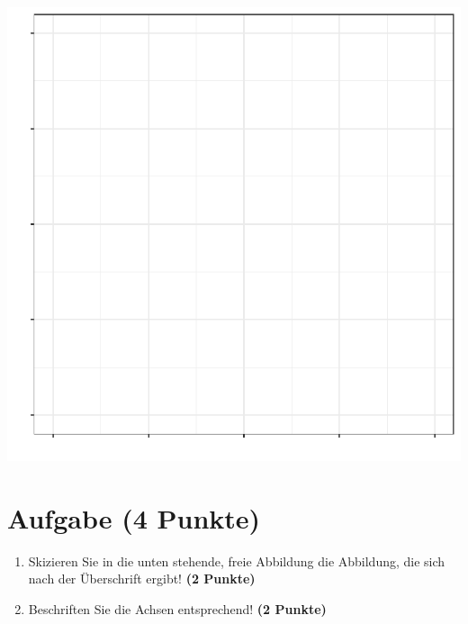 \documentclass[a4paper, 10pt]{scrartcl}\usepackage[]{graphicx}\usepackage[]{color}
\makeatletter
\def\maxwidth{ %
  \ifdim\Gin@nat@width>\linewidth
    \linewidth
  \else
    \Gin@nat@width
  \fi
}
\makeatother
\begin{document}
{\centering \includegraphics[width=\maxwidth]{img/regression-02-b-1} 

}


 
\clearpage

\section{Aufgabe \hfill (4 Punkte)}



\begin{enumerate}
\item Skizieren Sie in die unten stehende, freie Abbildung die
  Abbildung, die sich nach der {\"U}berschrift ergibt! \textbf{(2 Punkte)}
\item Beschriften Sie die Achsen entsprechend! \textbf{(2 Punkte)}
\end{enumerate}
\end{document}
